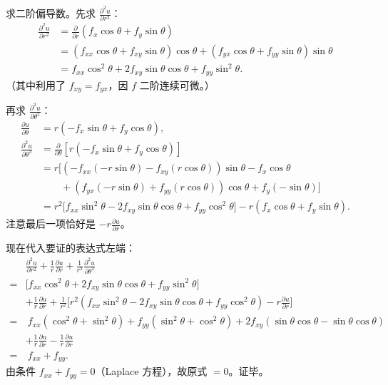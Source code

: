 \documentclass[12pt,a4paper]{ctexart}
\begin{document}
\begin{enumerate}[leftmargin=*,label=\arabic*.,start=9]
    求二阶偏导数。先求 $\frac{\partial^2 u}{\partial r^2}$：
    \begin{align*}
      \frac{\partial^2 u}{\partial r^2}
      &= \frac{\partial}{\partial r}(f_x \cos\theta + f_y \sin\theta) \\
      &= (f_{xx} \cos\theta + f_{xy} \sin\theta)\cos\theta
       + (f_{yx} \cos\theta + f_{yy} \sin\theta)\sin\theta \\
      &= f_{xx}\cos^2\theta + 2f_{xy}\sin\theta\cos\theta + f_{yy}\sin^2\theta.
    \end{align*}
    （其中利用了 $f_{xy} = f_{yx}$，因 $f$ 二阶连续可微。）

    再求 $\frac{\partial^2 u}{\partial\theta^2}$：
    \begin{align*}
      \frac{\partial u}{\partial\theta} &= r(-f_x \sin\theta + f_y \cos\theta), \\
      \frac{\partial^2 u}{\partial\theta^2}
      &= \frac{\partial}{\partial\theta}[r(-f_x \sin\theta + f_y \cos\theta)] \\
      &= r\Big[(-f_{xx}(-r\sin\theta) - f_{xy}(r\cos\theta))\sin\theta
               - f_x \cos\theta \\
      &\qquad   + (f_{yx}(-r\sin\theta) + f_{yy}(r\cos\theta))\cos\theta
               + f_y(-\sin\theta)\Big] \\
      &= r^2\bigl[f_{xx}\sin^2\theta - 2f_{xy}\sin\theta\cos\theta
                 + f_{yy}\cos^2\theta\bigr]
         - r(f_x\cos\theta + f_y\sin\theta).
    \end{align*}
    注意最后一项恰好是 $-r \frac{\partial u}{\partial r}$。

    现在代入要证的表达式左端：
    \begin{align*}
      &\frac{\partial^2 u}{\partial r^2} + \frac{1}{r}\frac{\partial u}{\partial r}
        + \frac{1}{r^2}\frac{\partial^2 u}{\partial\theta^2} \\
      = &\bigl[f_{xx}\cos^2\theta + 2f_{xy}\sin\theta\cos\theta + f_{yy}\sin^2\theta\bigr] \\
        &+ \frac{1}{r}\frac{\partial u}{\partial r}
          + \frac{1}{r^2}\Big[r^2(f_{xx}\sin^2\theta - 2f_{xy}\sin\theta\cos\theta
            + f_{yy}\cos^2\theta) - r\frac{\partial u}{\partial r}\Big] \\
      = &\ f_{xx}(\cos^2\theta+\sin^2\theta) + f_{yy}(\sin^2\theta+\cos^2\theta)
          + 2f_{xy}(\sin\theta\cos\theta - \sin\theta\cos\theta) \\
        &+ \frac{1}{r}\frac{\partial u}{\partial r} - \frac{1}{r}\frac{\partial u}{\partial r} \\[2pt]
      = &\ f_{xx} + f_{yy}.
    \end{align*}
    由条件 $f_{xx} + f_{yy} = 0$（Laplace 方程），故原式 $= 0$。证毕。
\end{enumerate}
\end{document}
